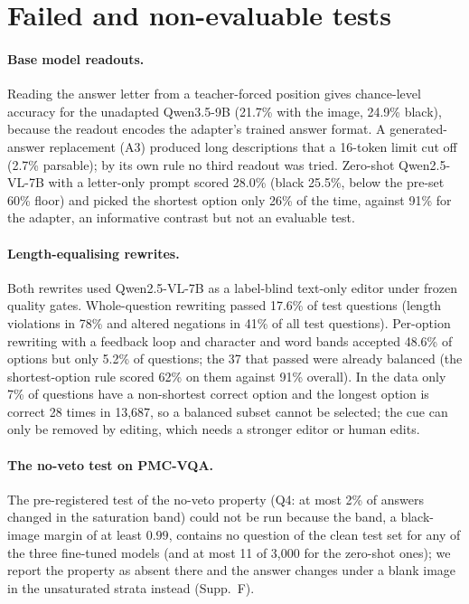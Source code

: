 \section{Failed and non-evaluable tests}
\label{app:fail}

\paragraph{Base model readouts.}
Reading the answer letter from a teacher-forced position gives chance-level accuracy for the unadapted Qwen3.5-9B (21.7\% with the image, 24.9\% black), because the readout encodes the adapter's trained answer format.
A generated-answer replacement (A3) produced long descriptions that a 16-token limit cut off (2.7\% parsable); by its own rule no third readout was tried.
Zero-shot Qwen2.5-VL-7B with a letter-only prompt scored 28.0\% (black 25.5\%, below the pre-set 60\% floor) and picked the shortest option only 26\% of the time, against 91\% for the adapter, an informative contrast but not an evaluable test.

\paragraph{Length-equalising rewrites.}
Both rewrites used Qwen2.5-VL-7B as a label-blind text-only editor under frozen quality gates.
Whole-question rewriting passed 17.6\% of test questions (length violations in 78\% and altered negations in 41\% of all test questions).
Per-option rewriting with a feedback loop and character and word bands accepted 48.6\% of options but only 5.2\% of questions; the 37 that passed were already balanced (the shortest-option rule scored 62\% on them against 91\% overall).
In the data only 7\% of questions have a non-shortest correct option and the longest option is correct 28 times in 13{,}687, so a balanced subset cannot be selected; the cue can only be removed by editing, which needs a stronger editor or human edits.

\paragraph{The no-veto test on PMC-VQA.}
The pre-registered test of the no-veto property (Q4: at most 2\% of answers changed in the saturation band) could not be run because the band, a black-image margin of at least $0.99$, contains no question of the clean test set for any of the three fine-tuned models (and at most 11 of 3{,}000 for the zero-shot ones); we report the property as absent there and the answer changes under a blank image in the unsaturated strata instead (Supp.~F).

